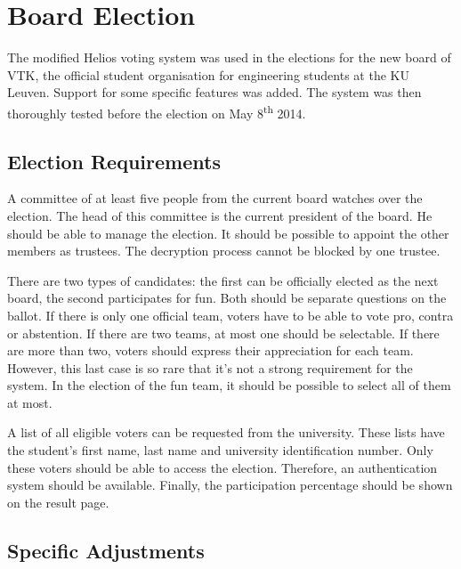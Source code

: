 % 
%

\section{Board Election}
\label{sec:board_election}

The modified Helios voting system was used in the elections for the new board of VTK, the official student organisation for engineering students at the KU Leuven. Support for some specific features was added. The system was then thoroughly tested before the election on May 8\textsuperscript{th} 2014.

\subsection{Election Requirements}


A committee of at least five people from the current board watches over the election. The head of this committee is the current president of the board. He should be able to manage the election. It should be possible to appoint the other members as trustees. The decryption process cannot be blocked by one trustee.


\par There are two types of candidates: the first can be officially elected as the next board, the second participates for fun. Both should be separate questions on the ballot. If there is only one official team, voters have to be able to vote pro, contra or abstention. If there are two teams, at most one should be selectable. If there are more than two, voters should express their appreciation for each team. However, this last case is so rare that it's not a strong requirement for the system. In the election of the fun team, it should be possible to select all of them at most.

\par A list of all eligible voters can be requested from the university. These lists have the student's first name, last name and university identification number. Only these voters should be able to access the election. Therefore, an authentication system should be available. Finally, the participation percentage should be shown on the result page.

\subsection{Specific Adjustments}

